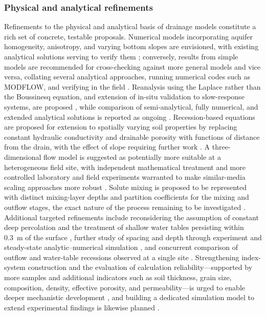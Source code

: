 \documentclass[11pt]{article}
\begin{document}
\subsubsection{Physical and analytical refinements}

Refinements to the physical and analytical basis of drainage models constitute a rich set of concrete, testable proposals. Numerical models incorporating aquifer homogeneity, anisotropy, and varying bottom slopes are envisioned, with existing analytical solutions serving to verify them \parencite{Lin2025}; conversely, results from simple models are recommended for cross-checking against more general models and vice versa, collating several analytical approaches, running numerical codes such as MODFLOW, and verifying in the field \parencite{Kacimov2000}. Reanalysis using the Laplace rather than the Boussinesq equation, and extension of in-situ validation to slow-response systems, are proposed \parencite{Bouarfa2000}, while comparison of semi-analytical, fully numerical, and extended analytical solutions is reported as ongoing \parencite{Wiskow2003}. Recession-based equations are proposed for extension to spatially varying soil properties by replacing constant hydraulic conductivity and drainable porosity with functions of distance from the drain, with the effect of slope requiring further work \parencite{Cooke2001}. A three-dimensional flow model is suggested as potentially more suitable at a heterogeneous field site, with independent mathematical treatment and more controlled laboratory and field experiments warranted to make similar-media scaling approaches more robust \parencite{Mohanty1997}. Solute mixing is proposed to be represented with distinct mixing-layer depths and partition coefficients for the mixing and outflow stages, the exact nature of the process remaining to be investigated \parencite{Shalit1996}. Additional targeted refinements include reconsidering the assumption of constant deep percolation and the treatment of shallow water tables persisting within 0.3~m of the surface \parencite{Kolars2019}, further study of spacing and depth through experiment and steady-state analytic--numerical simulation \parencite{Saptomo2021}, and concurrent comparison of outflow and water-table recessions observed at a single site \parencite{VANDELEUR1959}. Strengthening index-system construction and the evaluation of calculation reliability---supported by more samples and additional indicators such as soil thickness, grain size, composition, density, effective porosity, and permeability---is urged to enable deeper mechanistic development \parencite{Hou2018}, and building a dedicated simulation model to extend experimental findings is likewise planned \parencite{Tao2019b}.
\end{document}
